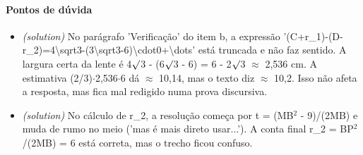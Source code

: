 \documentclass{article}%
\begin{document}
\paragraph{Pontos de dúvida}%
\begin{itemize}%
\item%
\textit{(solution)} No parágrafo 'Verificação' do item b, a expressão '(C+r\_1){-}(D{-}r\_2)=4\textbackslash{}sqrt3{-}(3\textbackslash{}sqrt3{-}6)\textbackslash{}cdot0+\textbackslash{}dots' está truncada e não faz sentido. A largura certa da lente é 4$\surd$3 - (6$\surd$3 - 6) = 6 - 2$\surd$3 $\approx$ 2,536 cm. A estimativa (2/3)$\cdot$2,536$\cdot$6 dá $\approx$ 10,14, mas o texto diz $\approx$ 10,2. Isso não afeta a resposta, mas fica mal redigido numa prova discursiva.%
\item%
\textit{(solution)} No cálculo de r\_2, a resolução começa por t = (MB$^2$ - 9)/(2MB) e muda de rumo no meio ('mas é mais direto usar...'). A conta final r\_2 = BP$^2$/(2MB) = 6 está correta, mas o trecho ficou confuso.%
\end{itemize}%
\end{document}
